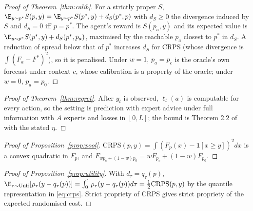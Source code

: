 \documentclass{article}
\newcommand{\crps}{\mathrm{CRPS}}
\begin{document}
\begin{proof}[Proof of Theorem~\ref{thm:calib}]
For a strictly proper $S$, $\E_{y\sim p^*}S(p,y)=\E_{y\sim p^*}S(p^*,y)+d_S(p^*,p)$ with $d_S\ge0$ the divergence induced by $S$ and $d_S=0$ iff $p=p^*$. The agent's reward is $S(p_a,y)$ and its expected value is $\E_{y\sim p^*}S(p^*,y)+d_S(p^*,p_a)$, maximised by the reachable $p_a$ closest to $p^*$ in $d_S$. A reduction of spread below that of $p^*$ increases $d_S$ for CRPS (whose divergence is $\int(F_a-F^*)^2$), so it is penalised. Under $w=1$, $p_a=p_c$ is the oracle's own forecast under context $c$, whose calibration is a property of the oracle; under $w=0$, $p_a=p_0$.
\end{proof}
\begin{proof}[Proof of Theorem~\ref{thm:regret}]
After $y_t$ is observed, $\ell_t(a)$ is computable for every action, so the setting is prediction with expert advice under full information with $A$ experts and losses in $[0,L]$; the bound is Theorem 2.2 of \citet{cesabianchi2006prediction} with the stated $\eta$.
\end{proof}
\begin{proof}[Proof of Proposition~\ref{prop:pool}]
$\crps(p,y)=\int(F_p(x)-\mathbf{1}[x\ge y])^2dx$ is a convex quadratic in $F_p$, and $F_{wp_c+(1-w)p_0}=wF_{p_c}+(1-w)F_{p_0}$.
\end{proof}
\begin{proof}[Proof of Proposition~\ref{prop:utility}]
With $d_\tau=q_\tau(p)$, $\E_{\tau\sim\mathrm{Unif}}[\rho_\tau(y-q_\tau(p))]=\int_0^1\rho_\tau(y-q_\tau(p))d\tau=\tfrac12\crps(p,y)$ by the quantile representation in \eqref{eq:crps}. Strict propriety of CRPS gives strict propriety of the expected randomised cost.
\end{proof}
\end{document}

